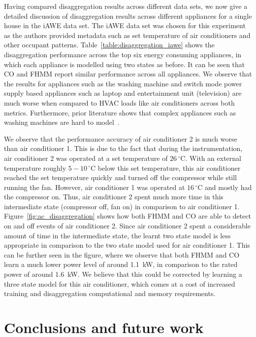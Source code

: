 \documentclass{sig-alternate}
\newcommand{\figref}[1]{Figure~\ref{#1}}
\newcommand{\tabref}[1]{Table~\ref{#1}}
\begin{document}
\noindent
Having compared disaggregation results across different data sets, we now give a detailed discussion of disaggregation results across different appliances for a single house in the iAWE data set. The iAWE data set was chosen for this experiment as the authors provided metadata such as set temperature of air conditioners and other occupant patterns. \tabref{table:disaggregation_iawe} shows the disaggregation performance across the top six energy consuming appliances, in which each appliance is modelled using two states as before. It can be seen that CO and FHMM report similar performance across all appliances. We observe that the results for appliances such as the washing machine and switch mode power supply based appliances such as laptop and entertainment unit (television) are much worse when compared to HVAC loads like air conditioners across both metrics. Furthermore, prior literature shows that complex appliances such as washing machines are hard to model~\cite{barker_2013}.

We observe that the performance accuracy of air conditioner 2 is much worse than air conditioner 1. This is due to the fact that during the instrumentation, air conditioner 2 was operated at a set temperature of $26\,^{\circ}\mathrm{C}$. With an external temperature roughly $5-10\,^{\circ}\mathrm{C}$ below this set temperature, this air conditioner reached the set temperature quickly and turned off the compressor while still running the fan. However, air conditioner 1 was operated at $16\,^{\circ}\mathrm{C}$ and mostly had the compressor on. Thus, air conditioner 2 spent much more time in this intermediate state (compressor off, fan on) in comparison to air conditioner 1. \figref{fig:ac_disaggregation} shows how both FHMM and CO are able to detect on and off events of air conditioner 2. Since air conditioner 2 spent a considerable amount of time in the intermediate state, the learnt two state model is less appropriate in comparison to the two state model used for air conditioner 1. This can be further seen in the figure, where we observe that both FHMM and CO learn a much lower power level of around 1.1~kW, in comparison to the rated power of around 1.6~kW. We believe that this could be corrected by learning a three state model for this air conditioner, which comes at a cost of increased training and disaggregation computational and memory requirements.


\section{Conclusions and future work}
\label{sec:conclusions}
\end{document}
